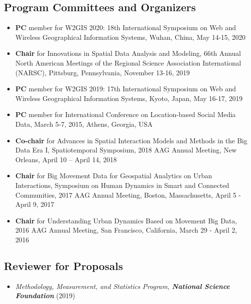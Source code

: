 \documentclass[11pt, a4paper]{article}
\begin{document}
\subsection*{Program Committees and Organizers}
\begin{itemize}
\item{\textbf{PC} member for W2GIS 2020: 18th International Symposium on Web and Wireless Geographical Information Systems, Wuhan, China, May 14-15, 2020}
\item{\textbf{Chair} for Innovations in Spatial Data Analysis and Modeling, 66th Annual North American Meetings of the Regional Science Association International (NARSC), Pittsburg, Pennsylvania, November 13-16, 2019}
\item{\textbf{PC} member for W2GIS 2019: 17th International Symposium on Web and Wireless Geographical Information Systems, Kyoto, Japan, May 16-17, 2019}
\item{\textbf{PC} member for International Conference on Location-based Social Media Data, March 5-7, 2015, Athens, Georgia, USA}
\item{\textbf{Co-chair} for Advances in Spatial Interaction Models and Methods in the Big Data Era I, Spatiotemporal Symposium, 2018 AAG Annual Meeting, New Orleans, April 10 – April 14, 2018}
\item{\textbf{Chair} for Big Movement Data for Geospatial Analytics on Urban Interactions, Symposium on Human Dynamics in Smart and Connected Communities, 2017 AAG Annual Meeting, Boston, Massachusetts, April 5 - April 9, 2017}
\item{\textbf{Chair} for Understanding Urban Dynamics Based on Movement Big Data, 2016 AAG Annual Meeting, San Francisco, California, March 29 - April 2, 2016}
\end{itemize}
\subsection*{Reviewer for Proposals}
\begin{itemize}
  \setlength\itemsep{0em}
  \item \emph{Methodology, Measurement, and Statistics Program, \textbf{National Science Foundation}} (2019)  
\end{itemize} 
\end{document}
